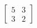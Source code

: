 \documentclass[preview]{standalone}
\begin{document}
\begin{align*}
\begin{bmatrix} 5 & 3 \\ 3 & 2 \end{bmatrix}
\end{align*}
\end{document}

